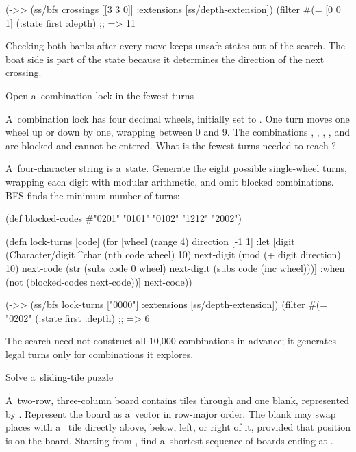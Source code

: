 {(->> (ss/bfs crossings [[3 3 0]]
                 {:extensions [ss/depth-extension]})
     (filter #(= [0 0 1] (:state %
     first
     :depth)
;; => 11
\endtt

Checking both banks after every move keeps unsafe states out of the search.
The boat side is part of the state because it determines the direction of
the next crossing.

\secc Open a~combination lock in the fewest turns

 A~combination lock has four decimal wheels,
initially set to . One turn moves one wheel up or down by one,
wrapping between 0 and 9. The combinations , ,
, , and  are blocked and cannot be
entered. What is the fewest turns needed to reach ?

\smallskip
{} A~four-character string is a~state. Generate the
eight possible single-wheel turns, wrapping each digit with modular
arithmetic, and omit blocked combinations. BFS finds the minimum number of
turns:

\begtt {}
(def blocked-codes #{"0201" "0101" "0102" "1212" "2002"})

(defn lock-turns [code]
  (for [wheel (range 4)
        direction [-1 1]
        :let [digit (Character/digit ^char (nth code wheel) 10)
              next-digit (mod (+ digit direction) 10)
              next-code (str (subs code 0 wheel)
                             next-digit
                             (subs code (inc wheel)))]
        :when (not (blocked-codes next-code))]
    next-code))

(->> (ss/bfs lock-turns ["0000"]
                 {:extensions [ss/depth-extension]})
     (filter #(= "0202" (:state %
     first
     :depth)
;; => 6
\endtt

The search need not construct all 10,000 combinations in advance; it
generates legal turns only for combinations it explores.

\secc Solve a~sliding-tile puzzle

 A~two-row, three-column board contains tiles
 through  and one blank, represented by . Represent
the board as a~vector in row-major order. The blank may swap places with a~
tile directly above, below, left, or right of it, provided that position is
on the board. Starting from \code{[4 1 3 0 2 5]}, find a~shortest sequence
of boards ending at \code{[1 2 3 4 5 0]}.

}
